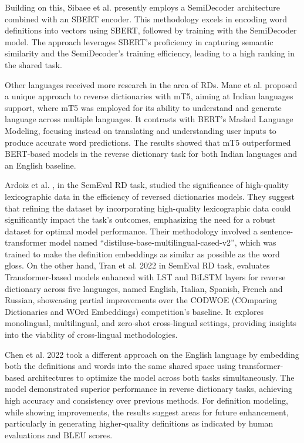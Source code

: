 \documentclass[12.5pt]{article}
\begin{document}
Building on this, Sibaee et al. \cite{Sibaee2023} presently employs a SemiDecoder architecture combined with an SBERT encoder. This methodology excels in encoding word definitions into vectors using SBERT, followed by training with the SemiDecoder model. The approach leverages SBERT's proficiency in capturing semantic similarity and the SemiDecoder's training efficiency, leading to a high ranking in the shared task.

Other languages received more research in the area of RDs. Mane et al. \cite{Mane2022} proposed a unique approach to reverse dictionaries with mT5, aiming at Indian languages support, where mT5 was employed for its ability to understand and generate language across multiple languages. It contrasts with BERT's Masked Language Modeling, focusing instead on translating and understanding user inputs to produce accurate word predictions. The results showed that mT5 outperformed BERT-based models in the reverse dictionary task for both Indian languages and an English baseline.

Ardoiz et al. \cite{Ardoiz2022}, in the SemEval RD task, studied the significance of high-quality lexicographic data in the efficiency of reversed dictionaries models. They suggest that refining the dataset by incorporating high-quality lexicographic data could significantly impact the task's outcomes, emphasizing the need for a robust dataset for optimal model performance. Their methodology involved a sentence-transformer model named “distiluse-base-multilingual-cased-v2”, which was trained to make the definition embeddings as similar as possible as the word gloss.
On the other hand, Tran et al. 2022 in SemEval RD task, evaluates Transformer-based models enhanced with LST and BiLSTM layers for reverse dictionary across five languages, named English, Italian, Spanish, French and Russian, showcasing partial improvements over the CODWOE (COmparing Dictionaries and WOrd Embeddings) competition's baseline. It explores monolingual, multilingual, and zero-shot cross-lingual settings, providing insights into the viability of cross-lingual methodologies.

Chen et al. 2022 \cite{Chen2022} took a different approach on the English language by embedding both the definitions and words into the same shared space using transformer-based architectures to optimize the model across both tasks simultaneously. The model demonstrated superior performance in reverse dictionary tasks, achieving high accuracy and consistency over previous methods. For definition modeling, while showing improvements, the results suggest areas for future enhancement, particularly in generating higher-quality definitions as indicated by human evaluations and BLEU scores.
\end{document}
